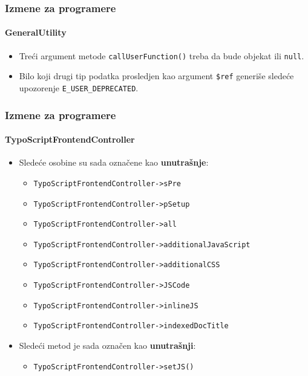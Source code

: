 \begin{frame}[fragile]
	\frametitle{Izmene za programere}
	\framesubtitle{GeneralUtility}

	\begin{itemize}
		\item Treći argument metode \texttt{callUserFunction()}
			treba da bude objekat ili \texttt{null}.
		\item Bilo koji drugi tip podatka prosledjen kao argument \texttt{\$ref} generiše sledeće upozorenje
			\texttt{E\_USER\_DEPRECATED}.
	\end{itemize}

\end{frame}


\begin{frame}[fragile]
	\frametitle{Izmene za programere}
	\framesubtitle{TypoScriptFrontendController}

	\begin{itemize}
		\item Sledeće osobine su sada označene kao \textbf{unutrašnje}:
			\begin{itemize}
				\item \texttt{TypoScriptFrontendController->sPre}
				\item \texttt{TypoScriptFrontendController->pSetup}
				\item \texttt{TypoScriptFrontendController->all}
				\item \texttt{TypoScriptFrontendController->additionalJavaScript}
				\item \texttt{TypoScriptFrontendController->additionalCSS}
				\item \texttt{TypoScriptFrontendController->JSCode}
				\item \texttt{TypoScriptFrontendController->inlineJS}
				\item \texttt{TypoScriptFrontendController->indexedDocTitle}
			\end{itemize}

		\item Sledeći metod je sada označen kao \textbf{unutrašnji}:

			\begin{itemize}
				\item \texttt{TypoScriptFrontendController->setJS()}
			\end{itemize}

	\end{itemize}

\end{frame}

